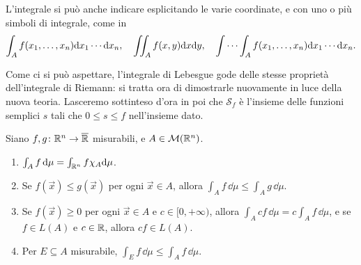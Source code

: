 L'integrale si può anche indicare esplicitando le varie coordinate, e con uno o più simboli di integrale, come in
\begin{equation*}
	\int_Af(x_1,\dots,x_n)\textup{d} x_1\cdots\textup{d} x_n,\quad \iint_Af(x,y)\textup{d} x\textup{d} y,\quad \idotsint_Af(x_1,\dots,x_n)\textup{d} x_1\cdots\textup{d} x_n.
\end{equation*}

Come ci si può aspettare, l'integrale di Lebesgue gode delle stesse proprietà dell'integrale di Riemann: si tratta ora di dimostrarle nuovamente in luce della nuova teoria.
Lasceremo sottinteso d'ora in poi che $\mathcal S_f$ è l'insieme delle funzioni semplici $s$ tali che $0\leq s\leq f$ nell'insieme dato.
\begin{proprieta} \label{pr:integrale-lebesgue}
	Siano $f,g\colon\mathbb{R}^n\to\overline{\mathbb{R}}$ misurabili, e $A\in\mathcal M(\mathbb{R}^n)$.
	\begin{enumerate}
		\item $\int_Af\,\textup{d}\mu=\int_{\mathbb{R}^n}f\chi_A\textup{d}\mu$.
		\item Se $f(\vec x)\leq g(\vec x)$ per ogni $\vec x\in A$, allora $\int_A f\,\dd\mu\leq\int_Ag\,\dd\mu$.
		\item Se $f(\vec x)\geq 0$ per ogni $\vec x\in A$ e $c\in[0,+\infty)$, allora $\int_Acf\,\dd\mu=c\int_Af\,\dd\mu$, e se $f\in L(A)$ e $c\in\mathbb{R}$, allora $cf\in L(A)$.
		\item Per $E\subseteq A$ misurabile, $\int_Ef\,\dd\mu\leq\int_Af\,\dd\mu$.
	\end{enumerate}
\end{proprieta}
